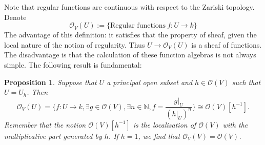 \documentclass[12pt,a4paper,english]{article}
\theoremstyle{plain}
\newtheorem{prop}[thm]{Proposition}
\theoremstyle{definition}
\theoremstyle{remark}
\begin{document}
Note that regular functions are continuous with respect to the Zariski topology. Denote
\begin{equation*}
    \mathcal{O}_{V}(U):=\{\text{Regular functions}\ f:U\rightarrow k\}
\end{equation*}
The advantage of this definition: it satisfies that the property of sheaf, given the local nature of the notion of regularity. Thus $U\rightarrow \mathcal{O}_{V}(U)$ is a sheaf of functions. The disadvantage is that the calculation of these function algebras is not always simple. The following result is fundamental:
\begin{prop}\label{propprin}
Suppose that $U$ a principal open subset and $h\in\mathcal{O}(V)$ such that $U=U_{h}$. Then 
\begin{equation*}
    \mathcal{O}_{V}(U)=\{f:U\rightarrow k, \exists g\in \mathcal{O}(V), \exists n\in\mathbb{N}, f=\frac{g|_{U}}{(h|_{U})^{n}}\}\cong \mathcal{O}(V)[h^{-1}].
\end{equation*}
Remember that the notion $\mathcal{O}(V)[h^{-1}]$ is the localisation of $\mathcal{O}(V)$ with the multiplicative part generated by $h$. If $h=1$, we find that $\mathcal{O}_{V}(V)=\mathcal{O}(V)$.
\end{prop}
\end{document}
